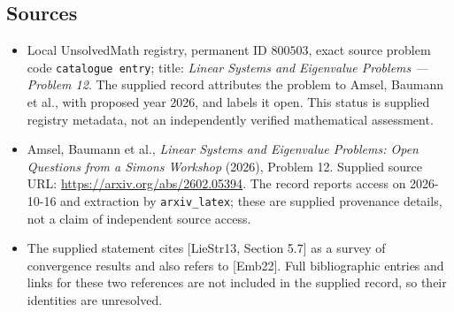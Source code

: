\documentclass[11pt]{article}
\begin{document}
\subsection{Sources}
\begin{itemize}
\item Local UnsolvedMath registry, permanent ID \(800503\), exact source problem code \texttt{catalogue entry}; title: \emph{Linear Systems and Eigenvalue Problems --- Problem 12}. The supplied record attributes the problem to Amsel, Baumann et al., with proposed year 2026, and labels it open. This status is supplied registry metadata, not an independently verified mathematical assessment.
\item Amsel, Baumann et al., \emph{Linear Systems and Eigenvalue Problems: Open Questions from a Simons Workshop} (2026), Problem 12. Supplied source URL: \url{https://arxiv.org/abs/2602.05394}. The record reports access on 2026-10-16 and extraction by \texttt{arxiv\_latex}; these are supplied provenance details, not a claim of independent source access.
\item The supplied statement cites [LieStr13, Section 5.7] as a survey of convergence results and also refers to [Emb22]. Full bibliographic entries and links for these two references are not included in the supplied record, so their identities are unresolved.
\end{itemize}
\end{document}
